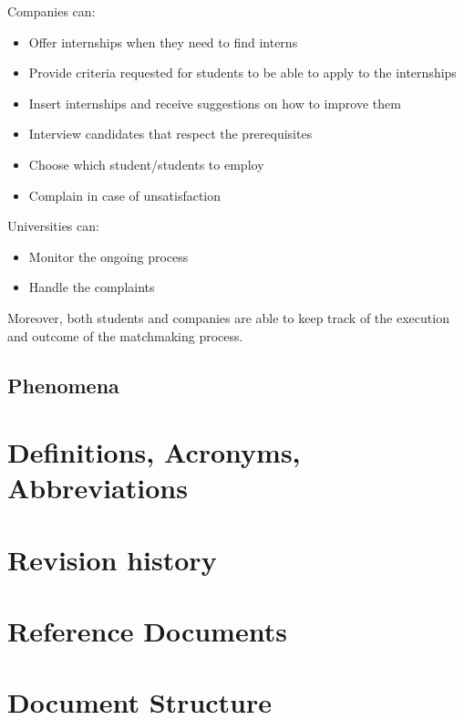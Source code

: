 Companies can:
\begin{itemize}
    \item Offer internships when they need to find interns
    \item Provide criteria requested for students to be able to apply to the internships
    \item Insert internships and receive suggestions on how to improve them
    \item Interview candidates that respect the prerequisites
    \item Choose which student/students to employ
    \item Complain in case of unsatisfaction
\end{itemize}

Universities can:
\begin{itemize}
    \item Monitor the ongoing process
    \item Handle the complaints
\end{itemize}
Moreover, both students and companies are able to keep track of the execution and outcome of the matchmaking process.
\subsection{Phenomena}

\section{Definitions, Acronyms, Abbreviations}

\section{Revision history}

\section{Reference Documents}

\section{Document Structure}
